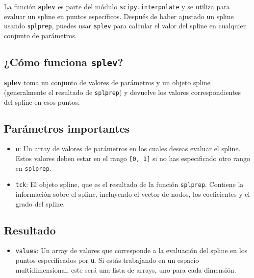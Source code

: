 La función \textbf{splev} es parte del módulo \texttt{scipy.interpolate} y se 
utiliza para evaluar un spline en puntos específicos. Después de haber ajustado 
un spline usando \texttt{splprep}, puedes usar \texttt{splev} para calcular el 
valor del spline en cualquier conjunto de parámetros.

\subsection*{¿Cómo funciona \texttt{splev}?}

\textbf{splev} toma un conjunto de valores de parámetros y un objeto spline 
(generalmente el resultado de \texttt{splprep}) y devuelve los valores 
correspondientes del spline en esos puntos.

\subsection*{Parámetros importantes}

\begin{itemize}
    \item \texttt{u}: Un array de valores de parámetros en los cuales deseas 
    evaluar el spline. Estos valores deben estar en el rango \texttt{[0, 1]} 
    si no has especificado otro rango en \texttt{splprep}.
    \item \texttt{tck}: El objeto spline, que es el resultado de la función 
    \texttt{splprep}. Contiene la información sobre el spline, incluyendo el 
    vector de nodos, los coeficientes y el grado del spline.
\end{itemize}

\subsection*{Resultado}

\begin{itemize}
    \item \texttt{values}: Un array de valores que corresponde a la evaluación 
    del spline en los puntos especificados por \texttt{u}. Si estás trabajando 
    en un espacio multidimensional, este será una lista de arrays, uno para cada 
    dimensión.
\end{itemize}
